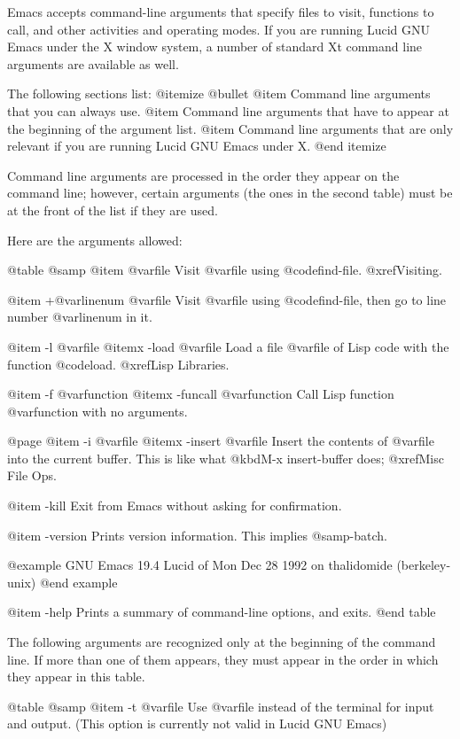 {{  Emacs accepts command-line arguments that specify files to visit,
functions to call, and other activities and operating modes.  If you are
running Lucid GNU Emacs under the X window system, a number of standard
Xt command line arguments are available as well. 

The following sections list:
@itemize @bullet
@item 
Command line arguments that you can always use.
@item 
Command line arguments that have to appear at the beginning of the
argument list.
@item
Command line arguments that are only relevant if you are running Lucid
GNU Emacs under X.
@end itemize

 Command line arguments are processed in the order they appear on the
command line; however, certain arguments (the ones in the
second table) must be at the front of the list if they are used.

  Here are the arguments allowed:

@table @samp
@item @var{file}
Visit @var{file} using @code{find-file}.  @xref{Visiting}.

@item +@var{linenum} @var{file}
Visit @var{file} using @code{find-file}, then go to line number
@var{linenum} in it.

@item -l @var{file}
@itemx -load @var{file}
Load a file @var{file} of Lisp code with the function @code{load}.
@xref{Lisp Libraries}.

@item -f @var{function}
@itemx -funcall @var{function}
Call Lisp function @var{function} with no arguments.

@page
@item -i @var{file}
@itemx -insert @var{file}
Insert the contents of @var{file} into the current buffer.  This is like
what @kbd{M-x insert-buffer} does; @xref{Misc File Ops}.

@item -kill
Exit from Emacs without asking for confirmation.

@item -version
Prints version information.  This implies @samp{-batch}.

@example
GNU Emacs 19.4 Lucid of Mon Dec 28 1992 on thalidomide (berkeley-unix)
@end example

@item -help
Prints a summary of command-line options, and exits.
@end table

  The following arguments are recognized only at the beginning of the
command line.  If more than one of them appears, they must appear in the
order in which they appear in this table.

@table @samp
@item -t @var{file}
Use @var{file} instead of the terminal for input and output. (This
option is currently not valid in Lucid GNU Emacs)

}}
